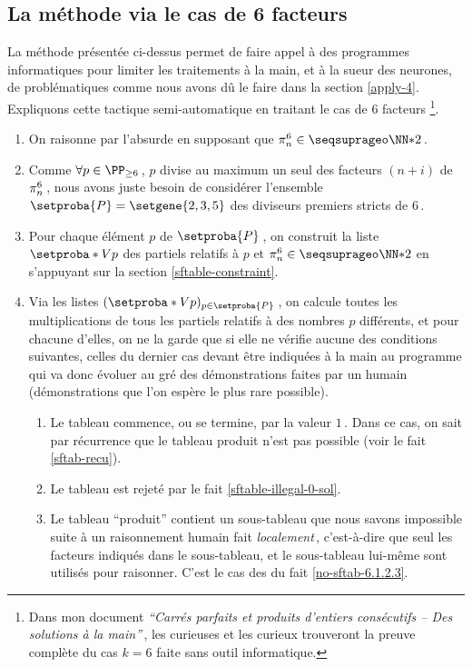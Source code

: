 \subsection{La méthode via le cas de 6 facteurs} \label{apply-6}

\leavevmode
\smallskip

La méthode présentée ci-dessus permet de faire appel à des programmes informatiques pour limiter les traitements à la main, et à la sueur des neurones, de \sftab[x] problématiques comme nous avons dû le faire dans la section \ref{apply-4}.
Expliquons cette tactique semi-automatique en traitant le cas de $6$ facteurs
\footnote{
	Dans mon document \emph{\enquote{Carrés parfaits et produits d’entiers consécutifs – Des solutions à la main}}\,, les curieuses et les curieux trouveront la preuve complète du cas $k = 6$ faite sans outil informatique.
}.

\begin{enumerate}
	\item On raisonne par l'absurde en supposant que $\consprod<6> \in \NNssquare$\,.


	\item Comme $\forall p \in \PP_{\geq 6}$\,, $p$ divise au maximum un seul des facteurs $(n + i)$ de $\consprod<6>$\,,
	nous avons juste besoin de considérer l'ensemble $\setproba{P} = \setgene{2, 3, 5}$ des diviseurs premiers stricts de $6$\,.


	\item Pour chaque élément $p$ de $\setproba{P}$\,, on construit la liste $\setproba*{V}{p}$ des \sftab[x] partiels relatifs à $p$ et $\consprod<6> \in \NNssquare$ en s'appuyant sur la section \ref{sftable-constraint}.


	\item Via les listes $( \setproba*{V}{p} )_{p \in \setproba{P}}$\,, on calcule toutes les multiplications de tous les \sftab[x] partiels relatifs à des nombres $p$ différents, et pour chacune d'elles, on ne la garde que si elle ne vérifie aucune des conditions suivantes, celles du dernier cas devant être indiquées à la main au programme qui va donc évoluer au gré des démonstrations faites par un humain (démonstrations que l'on espère le plus rare possible).
	\begin{enumerate}
		\item Le tableau commence, ou se termine, par la valeur $1$\,. Dans ce cas, on sait par récurrence que le tableau produit n'est pas possible (voir le fait \ref{sftab-recu}).

		\item Le tableau est rejeté par le fait \ref{sftable-illegal-0-sol}.

		\item Le tableau \enquote{produit} contient un sous-tableau que nous savons impossible suite à un raisonnement humain fait \emph{localement}\,, c'est-à-dire que seul les facteurs indiqués dans le sous-tableau, et le sous-tableau lui-même sont utilisés pour raisonner.
		C'est le cas des \sftab[x] du fait \ref{no-sftab-6.1.2.3}.
	\end{enumerate}
\end{enumerate}


